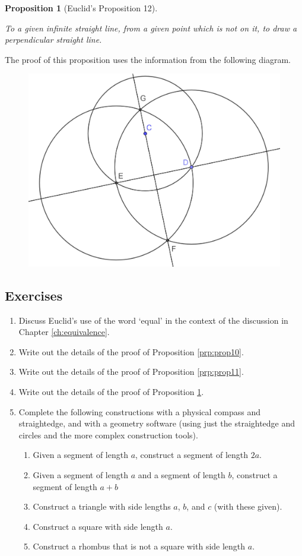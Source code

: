 \documentclass[
]{book}
\providecommand{\tightlist}{%
  \setlength{\itemsep}{0pt}\setlength{\parskip}{0pt}}
\newtheorem{proposition}{Proposition}[chapter]
\theoremstyle{definition}
\theoremstyle{definition}
\theoremstyle{definition}
\theoremstyle{definition}
\theoremstyle{remark}
\begin{document}
\begin{proposition}[Euclid's Proposition 12]
\protect\hypertarget{prp:prop12}{}\label{prp:prop12}

To a given infinite straight line, from a given point which is not on it, to draw a perpendicular straight line.

\end{proposition}

The proof of this proposition uses the information from the following diagram.

\begin{figure}

{\centering \includegraphics[width=0.45\linewidth]{images/Prop12} 

}

\end{figure}

\hypertarget{exercises-38}{%
\subsection{Exercises}\label{exercises-38}}

\begin{enumerate}
\def\labelenumi{\arabic{enumi}.}
\item
  Discuss Euclid's use of the word `equal' in the context of the discussion in Chapter \ref{ch:equivalence}.
\item
  Write out the details of the proof of Proposition \ref{prp:prop10}.
\item
  Write out the details of the proof of Proposition \ref{prp:prop11}.
\item
  Write out the details of the proof of Proposition \ref{prp:prop12}.
\item
  Complete the following constructions with a physical compass and straightedge, and with a geometry software (using just the straightedge and circles and the more complex construction tools).

  \begin{enumerate}
  \def\labelenumii{\alph{enumii}.}
  \tightlist
  \item
    Given a segment of length \(a\), construct a segment of length \(2a\).
  \item
    Given a segment of length \(a\) and a segment of length \(b\), construct a segment of length \(a+b\)
  \item
    Construct a triangle with side lengths \(a\), \(b\), and \(c\) (with these given).
  \item
    Construct a square with side length \(a\).
  \item
    Construct a rhombus that is not a square with side length \(a\).
  \end{enumerate}
\end{enumerate}
\end{document}

